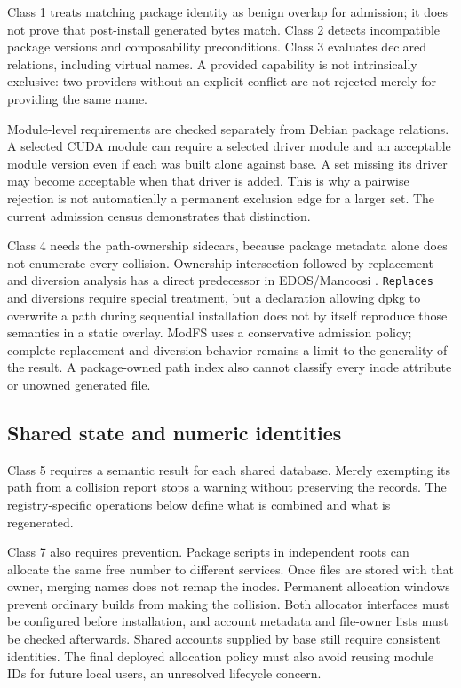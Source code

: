 Class \num{1} treats matching package identity as benign overlap for admission; it does not prove that post-install generated bytes match. Class \num{2} detects incompatible package versions and composability preconditions. Class \num{3} evaluates declared relations, including virtual names. A provided capability is not intrinsically exclusive: two providers without an explicit conflict are not rejected merely for providing the same name.

Module-level requirements are checked separately from Debian package relations. A selected CUDA module can require a selected driver module and an acceptable module version even if each was built alone against base. A set missing its driver may become acceptable when that driver is added. This is why a pairwise rejection is not automatically a permanent exclusion edge for a larger set. The current admission census demonstrates that distinction.

Class \num{4} needs the path-ownership sidecars, because package metadata alone does not enumerate every collision. Ownership intersection followed by replacement and diversion analysis has a direct predecessor in EDOS/Mancoosi \autocite[\S~2.2.5]{treinen2008solving}. \texttt{Replaces} and diversions require special treatment, but a declaration allowing dpkg to overwrite a path during sequential installation does not by itself reproduce those semantics in a static overlay. ModFS uses a conservative admission policy; complete replacement and diversion behavior remains a limit to the generality of the result. A package-owned path index also cannot classify every inode attribute or unowned generated file.

\subsection{Shared state and numeric identities}

Class \num{5} requires a semantic result for each shared database. Merely exempting its path from a collision report stops a warning without preserving the records. The registry-specific operations below define what is combined and what is regenerated.

Class \num{7} also requires prevention. Package scripts in independent roots can allocate the same free number to different services. Once files are stored with that owner, merging names does not remap the inodes. Permanent allocation windows prevent ordinary builds from making the collision. Both allocator interfaces must be configured before installation, and account metadata and file-owner lists must be checked afterwards. Shared accounts supplied by base still require consistent identities. The final deployed allocation policy must also avoid reusing module IDs for future local users, an unresolved lifecycle concern.


